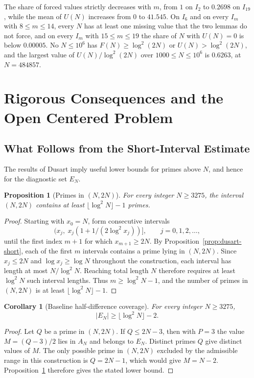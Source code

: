 \documentclass[11pt]{amsart}
\newtheorem{Proposition}[Theorem]{Proposition}
\newtheorem{Corollary}[Theorem]{Corollary}
\theoremstyle{definition}
\theoremstyle{remark}
\begin{document}
The share of forced values strictly decreases with $m$, from $1$ on $I_2$ to $0.2698$ on $I_{19}$, while the mean of $U(N)$ increases from $0$ to $41.545$. On $I_6$ and on every $I_m$ with $8\leq m\leq 14$, every $N$ has at least one missing value that the two lemmas do not force, and on every $I_m$ with $15\leq m\leq 19$ the share of $N$ with $U(N)=0$ is below $0.00005$. No $N\leq 10^6$ has $F(N)\geq\log^2(2N)$ or $U(N)>\log^2(2N)$, and the largest value of $U(N)/\log^2(2N)$ over $1000\leq N\leq 10^6$ is $0.6263$, at $N=484857$.
\section{Rigorous Consequences and the Open Centered Problem}\label{sec:main}
\subsection{What Follows from the Short-Interval Estimate}
The results of Dusart imply useful lower bounds for primes above $N$, and hence for the diagnostic set $E_N$.

\begin{Proposition}[Primes in $(N,2N)$]\label{prop:many-upper}
For every integer $N\geq 3275$, the interval $(N,2N)$ contains at least $\lfloor \log^2 N\rfloor-1$ primes.
\end{Proposition}
\begin{proof}
Starting with $x_0=N$, form consecutive intervals
\[
\bigl(x_j,\; x_j(1+1/(2\log^2 x_j))\bigr],\qquad j=0,1,2,\ldots,
\]
until the first index $m+1$ for which $x_{m+1}\geq 2N$. By Proposition~\ref{prop:dusart-short}, each of the first $m$ intervals contains a prime lying in $(N,2N)$. Since $x_j\leq 2N$ and $\log x_j\geq \log N$ throughout the construction, each interval has length at most $N/\log^2 N$. Reaching total length $N$ therefore requires at least $\log^2 N$ such interval lengths. Thus $m\geq \log^2 N-1$, and the number of primes in $(N,2N)$ is at least $\lfloor \log^2 N\rfloor-1$.
\end{proof}

\begin{Corollary}[Baseline half-difference coverage]\label{cor:half-difference-baseline}
For every integer $N\geq 3275$,
\[
|E_N|\geq \lfloor \log^2 N\rfloor-2.
\]
\end{Corollary}
\begin{proof}
Let $Q$ be a prime in $(N,2N)$. If $Q\leq 2N-3$, then with $P=3$ the value $M=(Q-3)/2$ lies in $A_N$ and belongs to $E_N$. Distinct primes $Q$ give distinct values of $M$. The only possible prime in $(N,2N)$ excluded by the admissible range in this construction is $Q=2N-1$, which would give $M=N-2$. Proposition~\ref{prop:many-upper} therefore gives the stated lower bound.
\end{proof}
\end{document}

